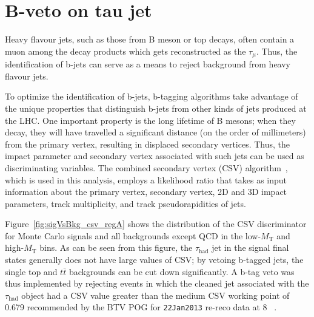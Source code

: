 \section{B-veto on tau jet\label{sec:evtsel-bveto}}

Heavy flavour jets, such as those from B meson or top decays, often contain a muon among the decay products which gets reconstructed as the $\tau_{\mu}$. Thus, the identification of b-jets can serve as a means to reject background from heavy flavour jets.

To optimize the identification of b-jets, b-tagging algorithms take advantage of the unique properties that distinguish b-jets from other kinds of jets produced at the LHC. One important property is the long lifetime of B mesons; when they decay, they will have travelled a significant distance (on the order of millimeters) from the primary vertex, resulting in displaced secondary vertices.  Thus, the impact parameter and secondary vertex associated with such jets can be used as discriminating variables. The combined secondary vertex (CSV) algorithm~\cite{Weiser:927399}, which is used in this analysis, employs a likelihood ratio that takes as input information about the primary vertex, secondary vertex, 2D and 3D impact parameters, track multiplicity, and track pseudorapidities of jets.

Figure~\ref{fig:sigVsBkg_csv_regA} shows the distribution of the CSV discriminator for Monte Carlo signals and all backgrounds except QCD in the low-$M_{\text{T}}$ and high-$M_{\text{T}}$ bins. As can be seen from this figure, the $\tau_{\text{had}}$ jet in the signal final states generally does not have large values of CSV; by vetoing b-tagged jets, the single top and $t\bar{t}$ backgrounds can be cut down significantly. A b-tag veto was thus implemented by rejecting events in which the cleaned jet associated with the $\tau_{\text{had}}$ object had a CSV value greater than the medium CSV working point of 0.679 recommended by the BTV POG for \texttt{22Jan2013} re-reco data at 8 \TeV~\cite{CMS:btvpogtwiki}.

